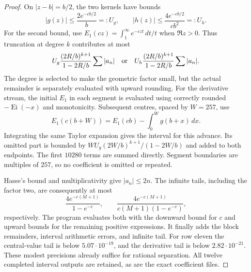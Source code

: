 \begin{proof}
On $|z-b|=b/2$, the two kernels have bounds
\[
 |g(z)|\leq\frac{2e^{-cb/2}}b=:U_g,
 \qquad
 |h(z)|\leq\frac{4e^{-cb/2}}{cb^2}=:U_h.
\]
For the second bound, use
$E_1(cz)=\int_1^\infty e^{-czt}\,dt/t$ when $\Re z>0$.
Thus truncation at degree $k$ contributes at most
\[
 U_g\frac{(2R/b)^{k+1}}{1-2R/b}\sum|a_n|
 \quad\hbox{or}\quad
 U_h\frac{(2R/b)^{k+1}}{1-2R/b}\sum|a_n|.
\]
The degree is selected to make the geometric factor small, but
the actual remainder is separately evaluated with upward rounding.
For the derivative stream, the initial $E_1$ in each segment is
evaluated using correctly rounded $-\operatorname{Ei}(-x)$ and
monotonicity. Subsequent centres, spaced by $W=257$, use
\[
 E_1(c(b+W))=E_1(cb)-\int_0^Wg(b+x)\,dx.
\]
Integrating the same Taylor expansion gives the interval for this
advance. Its omitted part is bounded by
$WU_g(2W/b)^{k+1}/(1-2W/b)$ and added to both endpoints.
The first $10280$ terms are summed directly. Segment boundaries
are multiples of $257$, so no coefficient is omitted or repeated.

Hasse's bound and multiplicativity give $|a_n|\leq2n$.
The infinite tails, including the factor two, are consequently at
most
\[
 \frac{4e^{-c(M+1)}}{1-e^{-c}},\qquad
 \frac{4e^{-c(M+1)}}{c(M+1)(1-e^{-c})},
\]
respectively. The program evaluates both with the downward bound
for $c$ and upward bounds for the remaining positive expressions.
It finally adds the block remainders, interval arithmetic errors,
and infinite tail. For row eleven the central-value tail is below
$5.07\cdot10^{-19}$, and the derivative tail is below
$2.82\cdot10^{-21}$. These modest precisions already suffice for
rational separation. All twelve completed interval outputs are
retained, as are the exact coefficient files.


\end{proof}
